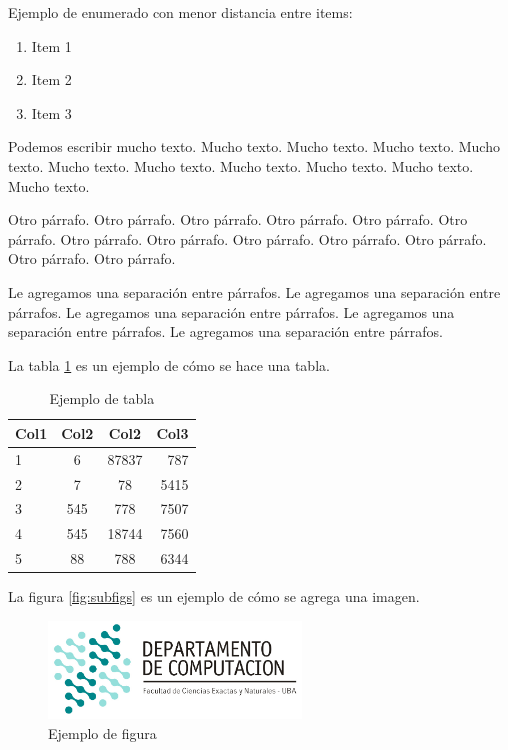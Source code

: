 \documentclass[10pt,a4paper]{article}
\begin{document}
Ejemplo de enumerado con menor distancia entre items:

\begin{enumerate} \setlength\itemsep{0cm}
	\item Item 1
	\item Item 2
	\item Item 3
\end{enumerate}

Podemos escribir mucho texto. Mucho texto. Mucho texto. Mucho texto. Mucho texto. Mucho texto. Mucho texto. Mucho texto. Mucho texto. Mucho texto. Mucho texto.

Otro párrafo. Otro párrafo. Otro párrafo. Otro párrafo. Otro párrafo. Otro párrafo. Otro párrafo. Otro párrafo. Otro párrafo. Otro párrafo. Otro párrafo. Otro párrafo. Otro párrafo.

\vspace{0.3cm}

Le agregamos una separación entre párrafos. Le agregamos una separación entre párrafos. Le agregamos una separación entre párrafos. Le agregamos una separación entre párrafos. Le agregamos una separación entre párrafos.

\vspace{0.3cm}

La tabla \ref{tab:ejemplo} es un ejemplo de cómo se hace una tabla.

\begin{table}[h!]
	\centering
	\begin{tabular}{||l c c r||} 
		\hline
		Col1 & Col2 & Col2 & Col3 \\ [0.5ex] 
		\hline\hline
		1 & 6 & 87837 & 787 \\ 
		2 & 7 & 78 & 5415 \\
		3 & 545 & 778 & 7507 \\
		4 & 545 & 18744 & 7560 \\
		5 & 88 & 788 & 6344 \\
		\hline
	\end{tabular}
	\caption{Ejemplo de tabla}
	\label{tab:ejemplo}
\end{table}


La figura \ref{fig:subfigs} es un ejemplo de cómo se agrega una imagen.

\begin{figure}[ht]
	\centering
	\includegraphics[width=0.6\textwidth]{logo_dc.jpg}
	\caption{Ejemplo de figura}
	\label{fig:ejemplo}
\end{figure}
\end{document}
